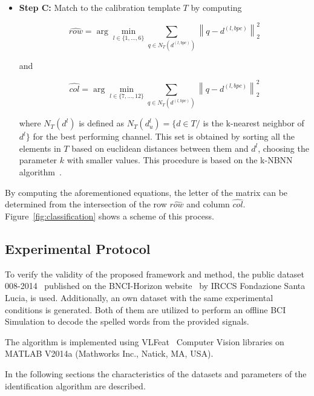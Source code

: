 \documentclass[utf8]{frontiersSCNS} %
\begin{document}
\begin{itemize}

\item \textbf{Step C:} Match to the calibration template $T$ by computing  

\begin{equation}
\hat{row} = \arg \min_{l \in \{1,\dots,6\}} \sum_{q \in N_T(d^{(l,bpc)})}^{} {\left\lVert q -  d^{(l,bpc)} \right\rVert}  ^{2}_2
\label{eq:multiclassificationrow}
\end{equation}

\noindent and

\begin{equation}
\hat{col} = \arg \min_{l \in \{7,\dots,12\}} \sum_{q \in N_T(d^{(l,bpc)})}^{} {\left\lVert q -  d^{(l,bpc)} \right\rVert} ^{2}_2
\label{eq:multiclassificationcol}
\end{equation}

\noindent where $N_T(d^l)$  is defined as $N_T(d^l_u) = \{d \in T / $  is the k-nearest neighbor of $ d^l \}$ for the best performing channel.  This set is obtained by sorting all the elements in $T$ based on euclidean distances between them and $d^l$, choosing the parameter $k$ with smaller values. This procedure is based on the k-NBNN  algorithm~\citep{Boiman2008}.

\end{itemize}
By computing the aforementioned equations, the letter of the matrix can be determined from the intersection of the row $ \hat{row} $ and column $ \hat{col} $. 
Figure~\ref{fig:classification} shows a scheme of this process. 

\subsection{Experimental Protocol} \label{Protocol}

To verify the validity of the proposed framework and method, the public dataset 008-2014~\citep{Riccio2013} published on the BNCI-Horizon website~\citep{Brunner2014} by  IRCCS Fondazione Santa Lucia, is used. Additionally, an own dataset with the same experimental conditions is generated. Both of them are utilized to perform an offline BCI Simulation to decode the spelled words from the provided signals. 

The algorithm is implemented using  VLFeat~\citep{Vedaldi2010} Computer Vision libraries on MATLAB V2014a (Mathworks Inc., Natick, MA, USA). 

In the following sections the characteristics of the datasets and parameters of the identification algorithm are described. 
\end{document}
